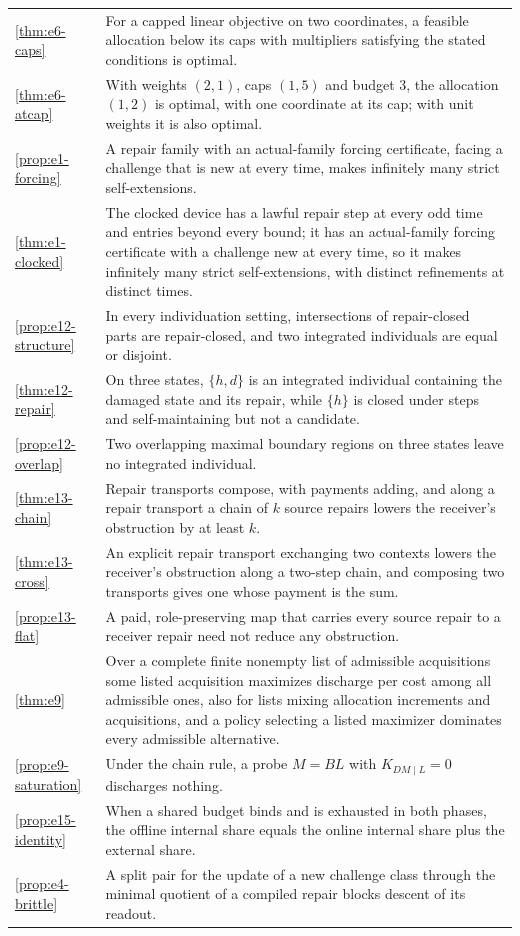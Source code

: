 \begin{longtable}{@{}>{\raggedright\arraybackslash}p{3.0cm}>{\raggedright\arraybackslash}p{12.4cm}@{}}
\cref{thm:e6-caps} & For a capped linear objective on two coordinates, a feasible allocation below its caps with multipliers satisfying the stated conditions is optimal. \\
\cref{thm:e6-atcap} & With weights $(2,1)$, caps $(1,5)$ and budget $3$, the allocation $(1,2)$ is optimal, with one coordinate at its cap; with unit weights it is also optimal. \\
\cref{prop:e1-forcing} & A repair family with an actual-family forcing certificate, facing a challenge that is new at every time, makes infinitely many strict self-extensions. \\
\cref{thm:e1-clocked} & The clocked device has a lawful repair step at every odd time and entries beyond every bound; it has an actual-family forcing certificate with a challenge new at every time, so it makes infinitely many strict self-extensions, with distinct refinements at distinct times. \\
\cref{prop:e12-structure} & In every individuation setting, intersections of repair-closed parts are repair-closed, and two integrated individuals are equal or disjoint. \\
\cref{thm:e12-repair} & On three states, $\{h,d\}$ is an integrated individual containing the damaged state and its repair, while $\{h\}$ is closed under steps and self-maintaining but not a candidate. \\
\cref{prop:e12-overlap} & Two overlapping maximal boundary regions on three states leave no integrated individual. \\
\cref{thm:e13-chain} & Repair transports compose, with payments adding, and along a repair transport a chain of $k$ source repairs lowers the receiver's obstruction by at least $k$. \\
\cref{thm:e13-cross} & An explicit repair transport exchanging two contexts lowers the receiver's obstruction along a two-step chain, and composing two transports gives one whose payment is the sum. \\
\cref{prop:e13-flat} & A paid, role-preserving map that carries every source repair to a receiver repair need not reduce any obstruction. \\
\cref{thm:e9} & Over a complete finite nonempty list of admissible acquisitions some listed acquisition maximizes discharge per cost among all admissible ones, also for lists mixing allocation increments and acquisitions, and a policy selecting a listed maximizer dominates every admissible alternative. \\
\cref{prop:e9-saturation} & Under the chain rule, a probe $M=BL$ with $K_{DM\mid L}=0$ discharges nothing. \\
\cref{prop:e15-identity} & When a shared budget binds and is exhausted in both phases, the offline internal share equals the online internal share plus the external share. \\
\cref{prop:e4-brittle} & A split pair for the update of a new challenge class through the minimal quotient of a compiled repair blocks descent of its readout. \\
\end{longtable}
\endgroup

